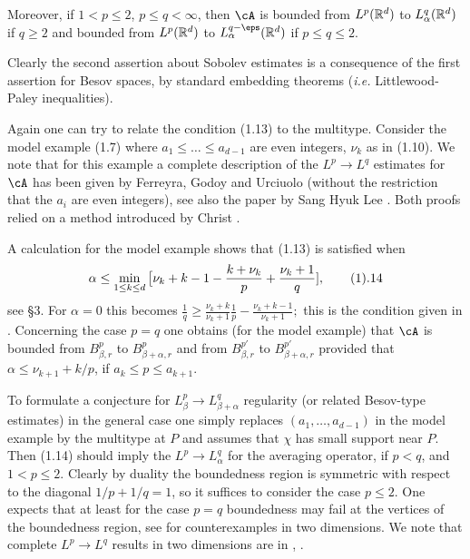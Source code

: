 Moreover, if $1<p\le 2$, $p\le q<\infty$,  then $\cA$ is bounded 
from $L^p(\Bbb R^d)$ to $L^q_\alpha(\Bbb R^d)$ if $q\ge 2$ and 
bounded 
from $L^p(\Bbb R^d)$ to $L^{q-\eps}_\alpha(\Bbb R^d)$ if $p\le q\le 2$.
\endproclaim

Clearly the second  assertion about  Sobolev estimates is a consequence of 
the first assertion for Besov spaces, by standard embedding theorems 
({\it i.e.} Littlewood-Paley inequalities).


Again one can try to  relate the condition (1.13) to the multitype.
Consider the model example (1.7)
where $a_1\le  \dots\le a_{d-1}$ are even integers, $\nu_k$ as in (1.10).
We note that for this example  a complete
description of the  $L^p\to L^q$ estimates for $\cA$ has been given by
Ferreyra, Godoy and Urciuolo \cite{10} (without the restriction that the 
$a_i$ are even integers), see also the paper 
by Sang Hyuk Lee \cite{16}. Both proofs relied on a method introduced by
 Christ \cite{5}.

A calculation for the model example  shows that   (1.13) is satisfied when
$$
\alpha\le \min_{1\le k\le d}\big[ \nu_k+k-1-\frac{k+\nu_k}{p}+
\frac{\nu_k+1}q],
\tag 1.14
$$
see \S3.
For $\alpha=0$ this becomes $\frac 1q\ge \frac{\nu_k+k}{\nu_k+1}
\frac 1p-\frac{\nu_k+k-1}{\nu_k+1};$
this is the condition given in \cite{10}.
Concerning the case $p=q$ one obtains (for the model example) that
 $\cA$ is bounded from
$B^p_{\beta,r}$ to $ B^p_{\beta+\alpha,r}$ 
and from $B^{p'}_{\beta,r}$ to $ B^{p'}_{\beta+\alpha,r}$ provided
that 
$\alpha\le \nu_{k+1}+k/p$, if $a_k\le p\le a_{k+1}$. 



To formulate a conjecture for $L^p_\beta\to L^{q}_{\beta+\alpha}$
regularity (or related Besov-type estimates) in the general case
 one simply replaces 
$(a_1,\dots,a_{d-1})$ in the model example by the multitype at $P$ and
 assumes that $\chi$ has small support near $P$. Then (1.14)
 should imply the 
$L^p\to L^{q}_\alpha$ for the averaging operator, if $p<q$, and $1<p\le 2$.
Clearly by duality the boundedness region is symmetric with respect to 
the diagonal
$1/p+1/q=1$, so it suffices to consider the case $p\le 2$.
One expects that at least
 for the case $p=q$ boundedness may fail at the vertices
of the boundedness region, see \cite{6} 
for counterexamples 
in two dimensions.
We note that complete $L^p\to L^q$ results
in two dimensions are  in
 \cite{19}, \cite{5}. 



